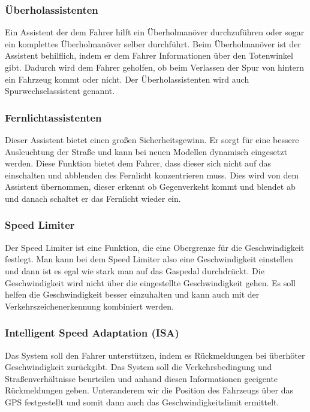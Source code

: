         \subsubsection{Überholassistenten}
        Ein Assistent der dem Fahrer hilft ein Überholmanöver durchzuführen oder sogar ein
        komplettes Überholmanöver selber durchführt. Beim Überholmanöver ist der Assistent 
        behilflich, indem er dem Fahrer Informationen über den Totenwinkel gibt. Dadurch 
        wird dem Fahrer geholfen, ob beim Verlassen der Spur von hintern ein Fahrzeug kommt 
        oder nicht. Der Überholassistenten wird auch Spurwechselassistent genannt.
        ~\cite{ueberholassi.PB1} ~\cite{spurwechsel.PB1} ~\cite{assistenzsysteme.PB1} 
        ~\cite{assistenzsysteme.PB2}
        
        \subsubsection{Fernlichtassistenten}
        Dieser Assistent bietet einen großen Sicherheitsgewinn. Er sorgt für eine bessere
        Ausleuchtung der Straße und kann bei neuen Modellen dynamisch eingesetzt werden.
        Diese Funktion bietet dem Fahrer, dass dieser sich nicht auf das einschalten und
        abblenden des Fernlicht konzentrieren muss. Dies wird von dem Assistent übernommen,
        dieser erkennt ob Gegenverkeht kommt und blendet ab und danach schaltet er das Fernlicht
        wieder ein.
        ~\cite{assistenzsysteme.PB2} ~\cite{Audi.PB1}

        \subsubsection{Speed Limiter}
        Der Speed Limiter ist eine Funktion, die eine Obergrenze für die Geschwindigkeit festlegt.
        Man kann bei dem Speed Limiter also eine Geschwindigkeit einstellen 
        und dann ist es egal wie stark man auf das Gaspedal durchdrückt. Die Geschwindigkeit wird nicht 
        über die eingestellte Geschwindigkeit gehen. Es soll helfen die Geschwindigkeit besser 
        einzuhalten und kann auch mit der Verkehrszeichenerkennung kombiniert werden.
        ~\cite{assistenzsysteme.PB2} ~\cite{assistenzsysteme.PB2} 

        \subsubsection{Intelligent Speed Adaptation (ISA)}
        Das System soll den Fahrer unterstützen, indem es Rückmeldungen bei überhöter Geschwindigkeit
        zurückgibt. Das System soll die Verkehrsbedingung und Straßenverhältnisse beurteilen und
        anhand diesen Informationen geeigente Rückmeldungen geben. Unteranderem wir die Position des 
        Fahrzeugs über das GPS festgestellt und somit dann auch das Geschwindigkeitslimit ermittelt.
        ~\cite{ISA.PB1}  ~\cite{speedlimiter.PB1} ~\cite{ISA.PB2}

